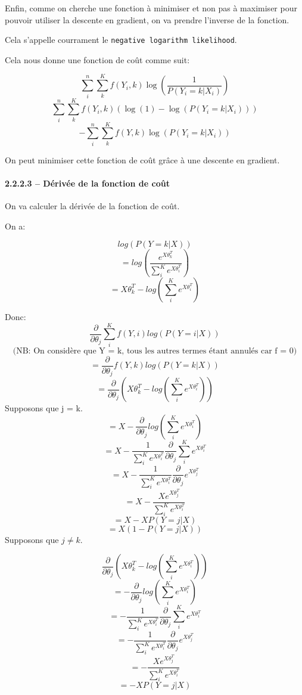 \documentclass[
]{article}
\begin{document}
Enfin, comme on cherche une fonction à minimiser et non pas à maximiser
pour pouvoir utiliser la descente en gradient, on va prendre l'inverse
de la fonction.

Cela s'appelle courrament le \texttt{negative\ logarithm\ likelihood}.

Cela nous donne une fonction de coût comme suit:

\[\sum_i^n \sum_k^K f(Y_i, k) \log(\frac{1}{P(Y_i = k | X_i)})\]
\[\sum_i^n \sum_k^K f(Y_i, k) (\log(1) - \log(P(Y_i = k | X_i)))\]
\[-\sum_i^n \sum_k^K f(Y, k)\log(P(Y_i = k | X_i))\]

On peut minimiser cette fonction de coût grâce à une descente en
gradient.

\hypertarget{duxe9rivuxe9e-de-la-fonction-de-couxfbt-1}{%
\paragraph{2.2.2.3 -- Dérivée de la fonction de
coût}\label{duxe9rivuxe9e-de-la-fonction-de-couxfbt-1}}

On va calculer la dérivée de la fonction de coût.

On a:

\[log(P(Y = k | X))\]
\[=log\left(\frac{e^{X \theta_k^T}}{\sum_i^K e^{X\theta_i^T}}\right)\]
\[=X \theta_k^T - log\left(\sum_i^K e^{X \theta_i^T}\right)\]

Donc:
\[\frac{\partial}{\partial \theta_{j}} \sum_i^K f(Y, i)log(P(Y = i | X))\]
\[\text{(NB: On considère que Y = k, tous les autres termes étant annulés car f = 0)}\]
\[=\frac{\partial}{\partial \theta_{j}} f(Y, k)log(P(Y = k | X))\]
\[=\frac{\partial}{\partial \theta_{j}} \left(X \theta_{k}^T - log\left(\sum_i^K e^{X \theta_i^T}\right)\right) \]
Supposons que j = k.
\[=X - \frac{\partial}{\partial \theta_{j}}log\left(\sum_i^K e^{X \theta_i^T}\right) \]
\[=X - \frac{1}{\sum_i^K e^{X \theta_i^T}} \frac{\partial}{\partial \theta_{j}}\sum_i^K e^{X \theta_i^T} \]
\[=X - \frac{1}{\sum_i^K e^{X \theta_i^T}} \frac{\partial}{\partial \theta_{j}}e^{X \theta_j^T}\]
\[=X - \frac{X e^{X \theta_j^T}}{\sum_i^K e^{X \theta_i^T}}\]
\[=X - X P(Y = j | X)\] \[=X (1 - P(Y = j | X))\] Supposons que
\(j \neq k\).

\[\frac{\partial}{\partial \theta_{j}} \left(X \theta_{k}^T - log\left(\sum_i^K e^{X \theta_i^T}\right)\right) \]
\[= - \frac{\partial}{\partial \theta_{j}}log\left(\sum_i^K e^{X \theta_i^T}\right) \]
\[= - \frac{1}{\sum_i^K e^{X \theta_i^T}} \frac{\partial}{\partial \theta_{j}}\sum_i^K e^{X \theta_i^T} \]
\[= - \frac{1}{\sum_i^K e^{X \theta_i^T}} \frac{\partial}{\partial \theta_{j}}e^{X \theta_j^T} \]
\[= - \frac{Xe^{X \theta_j^T}}{\sum_i^K e^{X \theta_i^T}} \]
\[= -X P(Y = j | X)\]
\end{document}

